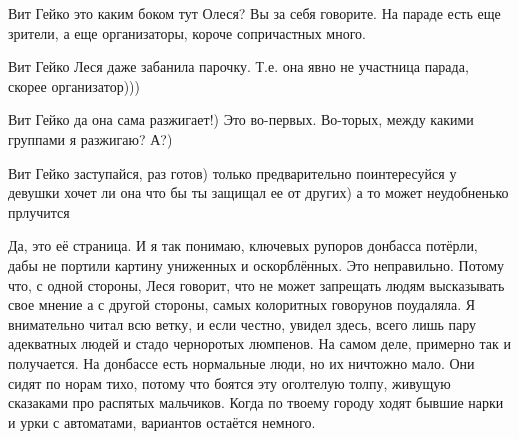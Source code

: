\begin{itemize}
\begin{itemize}
 
Вит Гейко это каким боком тут Олеся? Вы за себя говорите. На параде есть еще зрители, а еще организаторы, короче сопричастных много.

 
Вит Гейко Леся даже забанила парочку. Т.е. она явно не участница парада, скорее организатор)))

 
Вит Гейко да она сама разжигает!) Это во-первых. Во-торых, между какими группами я разжигаю? А?)

 
Вит Гейко заступайся, раз готов) только предварительно поинтересуйся у девушки
хочет ли она что бы ты защищал ее от других) а то может неудобненько прлучится

 

Да, это её страница. И я так понимаю, ключевых рупоров донбасса потёрли, дабы
не портили картину униженных и оскорблённых. Это неправильно. Потому что, с
одной стороны, Леся говорит, что не может запрещать людям высказывать свое
мнение а с другой стороны, самых колоритных говорунов поудаляла. Я внимательно
читал всю ветку, и если честно, увидел здесь, всего лишь пару адекватных людей
и стадо черноротых люмпенов. На самом деле, примерно так и получается. На
донбассе есть нормальные люди, но их ничтожно мало. Они сидят по норам тихо,
потому что боятся эту оголтелую толпу, живущую сказаками про распятых
мальчиков. Когда по твоему городу ходят бывшие нарки и урки с автоматами,
вариантов остаётся немного.



\end{itemize}
\end{itemize}
